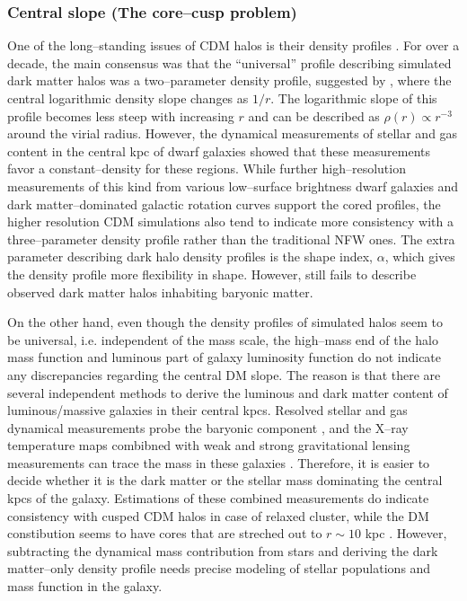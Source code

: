 \documentclass[paper=a4, fontsize=11pt]{scrartcl} %
\numberwithin{equation}{section} %
\numberwithin{figure}{section} %
\numberwithin{table}{section} %
\begin{document}
\subsubsection{Central slope (The core--cusp problem)}
\label{subsec:core-cusp}
One of the long--standing issues of CDM halos is their density profiles \citep[][]{Dubinski.Carlberg1991, Walker.Penarrubia2011}. For over a decade, the main consensus was that the ``universal'' profile describing simulated dark matter halos was a two--parameter density profile, suggested by \citet[][ hereafter NFW]{NFW}, where the central logarithmic density slope changes as $1/r$. The logarithmic slope of this profile becomes less steep with increasing $r$ and can be described as $\rho(r) \propto r^{-3}$ around the virial radius. However, the dynamical measurements of stellar and gas content in the central kpc of dwarf galaxies \citep[][]{} showed that these measurements favor a constant--density for these regions. While further high--resolution measurements of this kind from various low--surface brightness dwarf galaxies and dark matter--dominated galactic rotation curves support the cored profiles, the higher resolution CDM simulations also tend to indicate more consistency with a three--parameter density profile rather than the traditional NFW ones. The extra parameter describing dark halo density profiles is the shape index, $\alpha$, which gives the density profile more flexibility in shape. However, still fails to describe observed dark matter halos inhabiting baryonic matter. 

On the other hand, even though the density profiles of simulated halos seem to be universal, i.e. independent of the mass scale, the high--mass end of the halo mass function and luminous part of galaxy luminosity function do not indicate any discrepancies regarding the central DM slope. The reason is that there are several independent methods to derive the luminous and dark matter content of luminous/massive galaxies in their central kpcs. Resolved stellar and gas dynamical measurements probe the baryonic component \citep[][]{}, and the X--ray temperature maps combibned with weak and strong gravitational lensing measurements can trace the mass in these galaxies \citep[][]{}. Therefore, it is easier to decide whether it is the dark matter or the stellar mass dominating the central kpcs of the galaxy. Estimations of these combined measurements do indicate consistency with cusped CDM halos in case of relaxed cluster, while the DM constibution seems to have cores that are streched out to $r\sim 10$ kpc \citep[][]{}. However, subtracting the dynamical mass contribution from stars and deriving the dark matter--only density profile needs precise modeling of stellar populations and mass function in the galaxy. 
\end{document}
